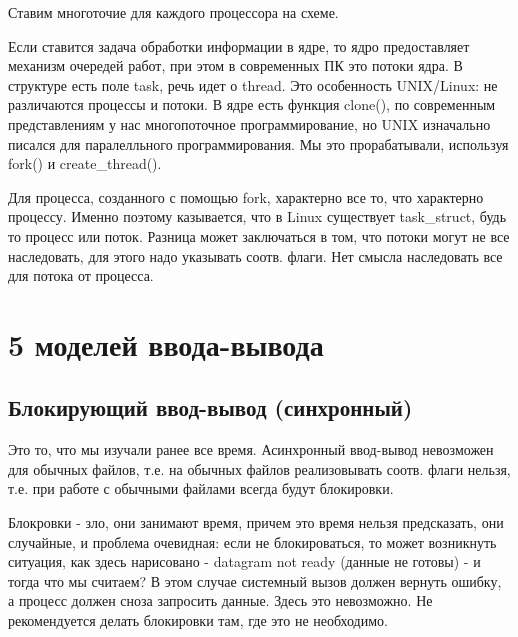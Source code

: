 \documentclass[12pt,a4paper]{scrreprt}
\begin{document}
\begin{figure}[!h]
\end{figure}

Ставим многоточие для каждого процессора на схеме.

Если ставится задача обработки информации в ядре, то ядро предоставляет механизм очередей работ, при этом в современных ПК это потоки ядра. В структуре есть поле task, речь идет о thread. Это особенность UNIX/Linux: не различаются процессы и потоки. В ядре есть функция clone(), по современным представлениям у нас многопоточное программирование, но UNIX изначально писался для паралелльного программирования. Мы это прорабатывали, используя fork() и create\_thread(). 

Для процесса, созданного с помощью fork, характерно все то, что характерно процессу. Именно поэтому казывается, что в Linux существует task\_struct, будь то процесс или поток. Разница может заключаться в том, что потоки могут не все наследовать, для этого надо указывать соотв. флаги. Нет смысла наследовать все для потока от процесса.

\section{5 моделей ввода-вывода}

\subsection*{Блокирующий ввод-вывод (синхронный)}

Это то, что мы изучали ранее все время. Асинхронный ввод-вывод невозможен для обычных файлов, т.е. на обычных файлов реализовывать соотв. флаги нельзя, т.е. при работе с обычными файлами всегда будут блокировки. 

Блокровки - зло, они занимают время, причем это время нельзя предсказать, они случайные, и проблема очевидная: если не блокироваться, то может возникнуть ситуация, как здесь нарисовано - datagram not ready (данные не готовы) - и тогда что мы считаем? В этом случае системный вызов должен вернуть ошибку, а процесс должен сноза запросить данные. Здесь это невозможно.  Не рекомендуется делать блокировки там, где это не необходимо. 
\end{document}
